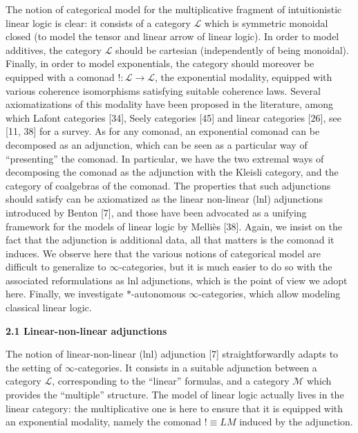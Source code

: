The notion of categorical model for the multiplicative fragment of intuitionistic linear logic is clear: it consists of a category ${\mathcal{L}}$ which is symmetric monoidal closed (to model the tensor and linear arrow of linear logic). In order to model additives, the category ${\mathcal{L}}$ should be cartesian (independently of being monoidal). Finally, in order to model exponentials, the category should moreover be equipped with a comonad $\mathop{!}:{\mathcal{L}}\to{\mathcal{L}}$, the exponential modality, equipped with various coherence isomorphisms satisfying suitable coherence laws. Several axiomatizations of this modality have been proposed in the literature, among which Lafont categories [34], Seely categories [45] and linear categories [26], see [11, 38] for a survey. As for any comonad, an exponential comonad can be decomposed as an adjunction, which can be seen as a particular way of “presenting” the comonad. In particular, we have the two extremal ways of decomposing the comonad as the adjunction with the Kleisli category, and the category of coalgebras of the comonad. The properties that such adjunctions should satisfy can be axiomatized as the linear non-linear (lnl) adjunctions introduced by Benton [7], and those have been advocated as a unifying framework for the models of linear logic by Melliès [38]. Again, we insist on the fact that the adjunction is additional data, all that matters is the comonad it induces. We observe here that the various notions of categorical model are difficult to generalize to $\infty$-categories, but it is much easier to do so with the associated reformulations as lnl adjunctions, which is the point of view we adopt here. Finally, we investigate $*$-autonomous $\infty$-categories, which allow modeling classical linear logic.\par
 
 
 
\par\medskip\noindent\textbf{2.1 Linear-non-linear adjunctions}\par
 
 
The notion of linear-non-linear (lnl) adjunction [7] straightforwardly adapts to the setting of $\infty$-categories. It consists in a suitable adjunction between a category ${\mathcal{L}}$, corresponding to the “linear” formulas, and a category ${\mathcal{M}}$ which provides the “multiple” structure. The model of linear logic actually lives in the linear category: the multiplicative one is here to ensure that it is equipped with an exponential modality, namely the comonad $\mathop{!}\equiv LM$ induced by the adjunction.\par
 
